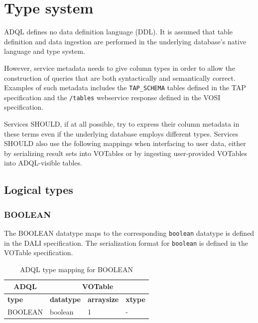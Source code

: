 \documentclass[11pt,a4paper]{ivoa}
\newcommand{\VOTspec}{VOTable specification\xspace}
\newcommand{\TAPspec}{TAP specification\xspace}
\newcommand{\DALIspec}{DALI specification\xspace}
\newcommand{\VOSIspec}{VOSI specification\xspace}
\begin{document}
\clearpage
\section{Type system}
\label{sec:types}

ADQL defines no data definition language (DDL).
It is assumed that table definition and data ingestion are performed in
the underlying database's native language and type system.

However, service metadata needs to give column types in order to allow the
construction of queries that are both syntactically and semantically correct.
Examples of such metadata includes the \verb:TAP_SCHEMA: tables defined
in the \TAPspec and the \verb:/tables:
webservice response defined in the \VOSIspec.

Services SHOULD, if at all possible, try to express their column metadata in
these terms even if the underlying database employs different types.
Services SHOULD also use the following mappings when interfacing to user data,
either by serializing result sets into VOTables or by ingesting user-provided
VOTables into ADQL-visible tables.

\subsection{Logical types}
\label{sec:types.logical}
\subsubsection{BOOLEAN}
\label{sec:types.logical.boolean}

The BOOLEAN datatype maps to the corresponding \verb:boolean: datatype is defined in the \DALIspec.
The serialization format for \verb:boolean: is defined in the \VOTspec.

\begin{table}[thm]\footnotesize
    \begin{tabular}
        {|p{}|p{}|p{}|p{}|}
        \hline

        \hline
        \multicolumn{1}{|c|}{\textbf{ADQL}} &
        \multicolumn{3}{|c|}{\textbf{VOTable}}
        \tabularnewline
        
        \hline
        \textbf{type} &
        \textbf{datatype} &
        \textbf{arraysize} &
        \textbf{xtype}
        \tabularnewline

        \hline
        BOOLEAN &
        boolean &
        1 &
        -
        \tabularnewline

        \hline
    \end{tabular}
    \caption{ADQL type mapping for BOOLEAN}
    \label{table:types.logical.boolean}
\end{table}
\end{document}

